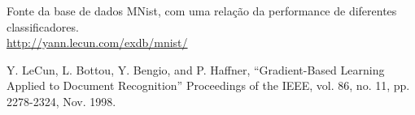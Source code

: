 \documentclass[12pt, a4paper, brazil, portuguese]{article}
\begin{document}
%
%
%
%


\begin{thebibliography}{99}

  Fonte da base de dados MNist, com uma relação da performance de diferentes classificadores.\\
  \url{http://yann.lecun.com/exdb/mnist/}

  Y. LeCun, L. Bottou, Y. Bengio, and P. Haffner, ``Gradient-Based Learning Applied to Document Recognition'' Proceedings of the IEEE, vol. 86, no. 11, pp. 2278-2324, Nov. 1998.
\end{thebibliography}
\end{document}
